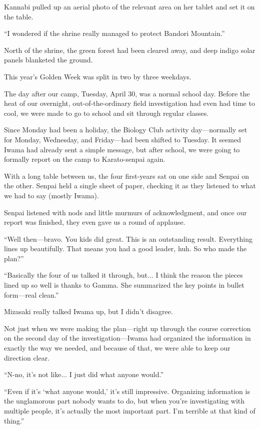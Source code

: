 \documentclass[
    a4paper,
    12pt,
    twoside,
    openany,
    UTF8,
    fontset=windows
]{ctexbook}
\begin{document}
Kannabi pulled up an aerial photo of the relevant area on her tablet and set it on the table.

``I wondered if the shrine really managed to protect Bandori Mountain.''

North of the shrine, the green forest had been cleared away, and deep indigo solar panels blanketed the ground.

This year's Golden Week was split in two by three weekdays.

The day after our camp, Tuesday, April 30, was a normal school day. Before the heat of our overnight, out-of-the-ordinary field investigation had even had time to cool, we were made to go to school and sit through regular classes.

Since Monday had been a holiday, the Biology Club activity day---normally set for Monday, Wednesday, and Friday---had been shifted to Tuesday. It seemed Iwama had already sent a simple message, but after school, we were going to formally report on the camp to Karato-senpai again.

With a long table between us, the four first-years sat on one side and Senpai on the other. Senpai held a single sheet of paper, checking it as they listened to what we had to say (mostly Iwama).

Senpai listened with nods and little murmurs of acknowledgment, and once our report was finished, they even gave us a round of applause.

``Well then---bravo. You kids did great. This is an outstanding result. Everything lines up beautifully. That means you had a good leader, huh. So who made the plan?''

``Basically the four of us talked it through, but... I think the reason the pieces lined up so well is thanks to Gamma. She summarized the key points in bullet form---real clean.''

Mizasaki really talked Iwama up, but I didn't disagree.

Not just when we were making the plan---right up through the course correction on the second day of the investigation---Iwama had organized the information in exactly the way we needed, and because of that, we were able to keep our direction clear.

``N-no, it's not like... I just did what anyone would.''

``Even if it's `what anyone would,' it's still impressive. Organizing information is the unglamorous part nobody wants to do, but when you're investigating with multiple people, it's actually the most important part. I'm terrible at that kind of thing.''
\end{document}
